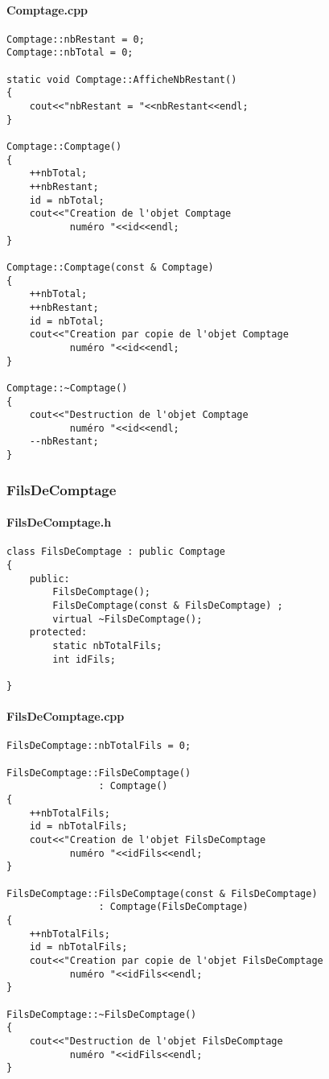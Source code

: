 \documentclass[10pt,a4paper,twoside]{article}
\begin{document}
\paragraph{Comptage.cpp}
\begin{verbatim}
Comptage::nbRestant = 0;
Comptage::nbTotal = 0;

static void Comptage::AfficheNbRestant()
{
    cout<<"nbRestant = "<<nbRestant<<endl;
}

Comptage::Comptage()
{
    ++nbTotal;
    ++nbRestant;
    id = nbTotal;
    cout<<"Creation de l'objet Comptage 
           numéro "<<id<<endl;
}

Comptage::Comptage(const & Comptage)
{
    ++nbTotal;
    ++nbRestant;
    id = nbTotal;
    cout<<"Creation par copie de l'objet Comptage 
           numéro "<<id<<endl;
}

Comptage::~Comptage()
{
    cout<<"Destruction de l'objet Comptage 
           numéro "<<id<<endl;
    --nbRestant;
}
\end{verbatim}


\subsubsection{FilsDeComptage}
\paragraph{FilsDeComptage.h}
\begin{verbatim}
class FilsDeComptage : public Comptage
{
    public:
        FilsDeComptage();
        FilsDeComptage(const & FilsDeComptage) ;
        virtual ~FilsDeComptage();
    protected:
        static nbTotalFils;
        int idFils;
    
}
\end{verbatim}

\paragraph{FilsDeComptage.cpp}
\begin{verbatim}
FilsDeComptage::nbTotalFils = 0;

FilsDeComptage::FilsDeComptage() 
                : Comptage()
{
    ++nbTotalFils;
    id = nbTotalFils;
    cout<<"Creation de l'objet FilsDeComptage 
           numéro "<<idFils<<endl;
}

FilsDeComptage::FilsDeComptage(const & FilsDeComptage)
                : Comptage(FilsDeComptage)
{
    ++nbTotalFils;
    id = nbTotalFils;
    cout<<"Creation par copie de l'objet FilsDeComptage 
           numéro "<<idFils<<endl;
}

FilsDeComptage::~FilsDeComptage()
{
    cout<<"Destruction de l'objet FilsDeComptage 
           numéro "<<idFils<<endl;
}
\end{verbatim}
\end{document}
